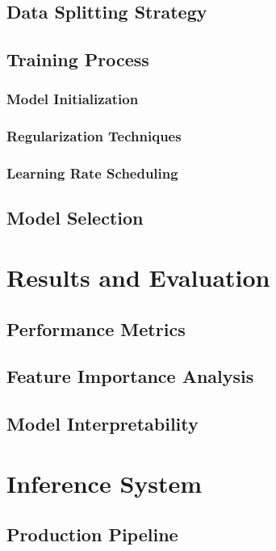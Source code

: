 \documentclass[12pt,a4paper]{article}
\begin{document}
\subsection{Data Splitting Strategy}

\subsection{Training Process}

\subsubsection{Model Initialization}

\subsubsection{Regularization Techniques}

\subsubsection{Learning Rate Scheduling}

\subsection{Model Selection}

\section{Results and Evaluation}

\subsection{Performance Metrics}

\subsection{Feature Importance Analysis}

\subsection{Model Interpretability}

\section{Inference System}

\subsection{Production Pipeline}
\end{document}
